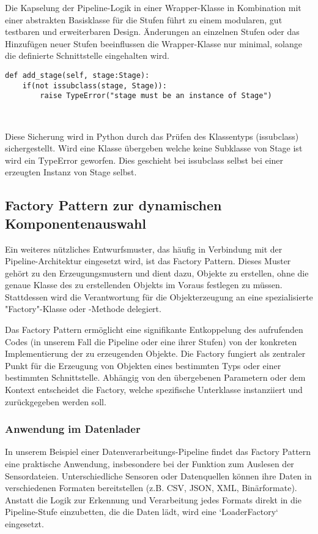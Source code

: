 \documentclass[a4paper]{article} %
\begin{document}
Die Kapselung der Pipeline-Logik in einer Wrapper-Klasse in Kombination mit einer abstrakten Basisklasse für die Stufen führt zu einem modularen, gut testbaren und erweiterbaren Design. Änderungen an einzelnen Stufen oder das Hinzufügen neuer Stufen beeinflussen die Wrapper-Klasse nur minimal, solange die definierte Schnittstelle eingehalten wird.

\begin{verbatim}
def add_stage(self, stage:Stage):
    if(not issubclass(stage, Stage)):
        raise TypeError("stage must be an instance of Stage")
\end{verbatim}\

Diese Sicherung wird in Python durch das Prüfen des Klassentyps (issubclass) sichergestellt. Wird eine Klasse übergeben welche keine Subklasse von Stage ist wird ein TypeError geworfen. Dies geschieht bei issubclass selbst bei einer erzeugten Instanz von Stage selbst.

\subsection{Factory Pattern zur dynamischen Komponentenauswahl}
Ein weiteres nützliches Entwurfsmuster, das häufig in Verbindung mit der Pipeline-Architektur eingesetzt wird, ist das Factory Pattern. Dieses Muster gehört zu den Erzeugungsmustern und dient dazu, Objekte zu erstellen, ohne die genaue Klasse des zu erstellenden Objekts im Voraus festlegen zu müssen. Stattdessen wird die Verantwortung für die Objekterzeugung an eine spezialisierte "Factory"-Klasse oder -Methode delegiert.

Das Factory Pattern ermöglicht eine signifikante Entkoppelung des aufrufenden Codes (in unserem Fall die Pipeline oder eine ihrer Stufen) von der konkreten Implementierung der zu erzeugenden Objekte. Die Factory fungiert als zentraler Punkt für die Erzeugung von Objekten eines bestimmten Typs oder einer bestimmten Schnittstelle. Abhängig von den übergebenen Parametern oder dem Kontext entscheidet die Factory, welche spezifische Unterklasse instanziiert und zurückgegeben werden soll.

\subsubsection{Anwendung im Datenlader}
In unserem Beispiel einer Datenverarbeitungs-Pipeline findet das Factory Pattern eine praktische Anwendung, insbesondere bei der Funktion zum Auslesen der Sensordateien. Unterschiedliche Sensoren oder Datenquellen können ihre Daten in verschiedenen Formaten bereitstellen (z.B. CSV, JSON, XML, Binärformate). Anstatt die Logik zur Erkennung und Verarbeitung jedes Formats direkt in die Pipeline-Stufe einzubetten, die die Daten lädt, wird eine `LoaderFactory` eingesetzt.
\end{document}
